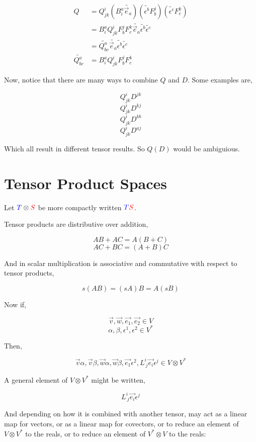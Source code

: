 \documentclass[12pt]{book}
\theoremstyle{plain}
\theoremstyle{definition}
\theoremstyle{ppart}
\theoremstyle{case}
\theoremstyle{solution}
\begin{document}
\begin{align*}
  Q &= Q^i_{jk} (B^a_i \widetilde{\vec{e}_a}) (\widetilde{\epsilon^b} F^j_b) (\widetilde{\epsilon^c} F^k_c) \\
  &= B^a_i Q^i_{jk} F^j_b F^k_c \widetilde{\vec{e}_a} \widetilde{\epsilon^b} \widetilde{\epsilon^c} \\
  &= \widetilde{Q^a_{bc}} \widetilde{\vec{e}_a} \widetilde{\epsilon^b} \widetilde{\epsilon^c} \\
  \widetilde{Q^a_{bc}} &= B^a_i Q^i_{jk} F^j_b F^k_c
\end{align*}

Now, notice that there are many ways to combine $Q$ and $D$. Some examples are,

\[ Q^i_{jk} D^{jk} \]
\[ Q^i_{jk} D^{kj} \]
\[ Q^i_{jk} D^{kb} \]
\[ Q^i_{jk} D^{aj} \]

Which all result in different tensor results. So $Q(D)$ would be ambiguious.

\section{Tensor Product Spaces}

Let ${\color{blue}T} \otimes {\color{red}S}$ be more compactly written ${\color{blue}T}{\color{red}S}$.

Tensor products are distributive over addition,

\[ AB + AC = A(B+C) \]
\[ AC + BC = (A+B)C \]

And in scalar multiplication is associative and commutative with respect to tensor products,

\[ s(AB) = (sA)B = A(sB) \]

Now if,

\[ \vec{v}, \vec{w}, \vec{e_1}, \vec{e_2} \in V \]
\[ \alpha, \beta, \epsilon^1, \epsilon^2 \in V^* \]

Then,

\[ \vec{v} \alpha, \vec{v} \beta, \vec{w} \alpha, \vec{w} \beta, \vec{e_1} \epsilon^2, L^i_{~j} \vec{e_i} \epsilon^j \in V \otimes V^* \]

A general element of $V \otimes V^*$ might be written,

\[ L^i_{~j} \vec{e_i} \epsilon^j \]

And depending on how it is combined with another tensor, may act as a linear map for vectors, or as a linear map for covectors,
or to reduce an element of $V \otimes V^*$ to the reals, or to reduce an element of $V^* \otimes V$ to the reals:
\end{document}
